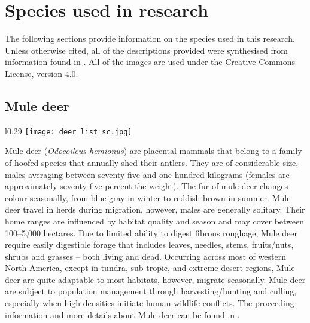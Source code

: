 \chapter{Species used in research}\label{apx:B}
\newpage

The following sections provide information on the species used in this research. Unless otherwise cited, all of the descriptions provided were synthesised from information found in \cite{vand08}. All of the images are used under the Creative Commons License, version 4.0.

\section{Mule deer}\label{deer}
\vspace{-0.3cm}
\setlength\intextsep{0pt}
\begin{wrapfigure}{l}{0.29\textwidth}
\centering
\texttt{[image: deer\_list\_sc.jpg]}
\end{wrapfigure}
Mule deer (\textit{Odocoileus hemionus}) are placental mammals that belong to a family of hoofed species that annually shed their antlers. They are of considerable size, males averaging between seventy-five and one-hundred kilograms (females are approximately seventy-five percent the weight). The fur of mule deer changes colour seasonally, from blue-gray in winter to reddish-brown in summer. Mule deer travel in herds during migration, however, males are generally solitary. Their home ranges are influenced by habitat quality and season and may cover between 100--5,000 hectares. Due to limited ability to digest fibrous roughage, Mule deer require easily digestible forage that includes leaves, needles, stems, fruits/nuts, shrubs and grasses -- both living and dead. Occurring across most of western North America, except in tundra, sub-tropic, and extreme desert regions, Mule deer are quite adaptable to most habitats, however, migrate seasonally. Mule deer are subject to population management through harvesting/hunting and culling, especially when high densities initiate human-wildlife conflicts. The proceeding information and more details about Mule deer can be found in \cite{ferg05}.

